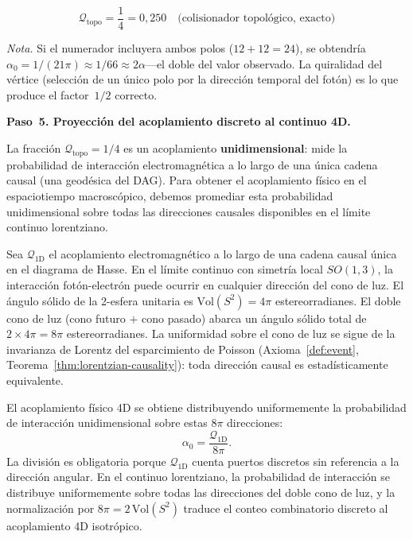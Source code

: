 \documentclass[11pt, a4paper, openany]{book}
\begin{document}
\[
  \mathcal{Q}_{\mathrm{topo}} = \frac{1}{4} = 0{,}250
  \quad\text{(colisionador topol\'ogico, exacto)}
\]

\noindent\textit{Nota.}\enspace
Si el numerador incluyera ambos polos ($12 + 12 = 24$), se obtendr\'ia
$\alpha_0 = 1/(21\pi) \approx 1/66 \approx 2\alpha$---el doble del
valor observado. La quiralidad del v\'ertice (selecci\'on de un
\'unico polo por la direcci\'on temporal del fot\'on) es lo que
produce el factor~$1/2$ correcto.

\bigskip
\noindent
\textbf{Paso~5. Proyecci\'on del acoplamiento discreto al continuo 4D.}

La fracci\'on $\mathcal{Q}_{\mathrm{topo}} = 1/4$ es un acoplamiento
\textbf{unidimensional}: mide la probabilidad de interacci\'on
electromagn\'etica a lo largo de una \'unica cadena causal (una geod\'esica
del DAG). Para obtener el acoplamiento f\'isico en el espaciotiempo
macrosc\'opico, debemos promediar esta probabilidad unidimensional sobre
todas las direcciones causales disponibles en el l\'imite continuo
lorentziano.

\begin{lemma}
\label{lem:angular-averaging}
Sea $\mathcal{Q}_{\mathrm{1D}}$ el acoplamiento electromagn\'etico a lo
largo de una cadena causal \'unica en el diagrama de Hasse. En el
l\'imite continuo con simetr\'ia local $SO(1,3)$, la interacci\'on
fot\'on-electr\'on puede ocurrir en cualquier direcci\'on del cono de
luz. El \'angulo s\'olido de la 2-esfera unitaria es
$\mathrm{Vol}(S^2) = 4\pi$ estereorradianes. El doble cono de luz
(cono futuro $+$ cono pasado) abarca un \'angulo s\'olido total de
$2 \times 4\pi = 8\pi$ estereorradianes. La uniformidad sobre el cono
de luz se sigue de la invarianza de Lorentz del esparcimiento de
Poisson (Axioma~\ref{def:event},
Teorema~\ref{thm:lorentzian-causality}): toda direcci\'on causal es
estad\'isticamente equivalente.

El acoplamiento f\'isico 4D se obtiene distribuyendo uniformemente la
probabilidad de interacci\'on unidimensional sobre estas $8\pi$
direcciones:
\[
  \alpha_0 = \frac{\mathcal{Q}_{\mathrm{1D}}}{8\pi}.
\]
La divisi\'on es obligatoria porque $\mathcal{Q}_{\mathrm{1D}}$ cuenta
puertos discretos sin referencia a la direcci\'on angular. En el
continuo lorentziano, la probabilidad de interacci\'on se distribuye
uniformemente sobre todas las direcciones del doble cono de luz, y la
normalizaci\'on por $8\pi = 2\,\mathrm{Vol}(S^2)$ traduce el conteo
combinatorio discreto al acoplamiento 4D isotr\'opico.
\end{lemma}
\end{document}
